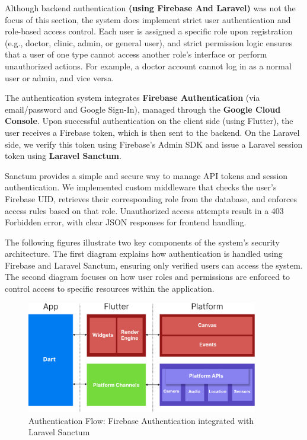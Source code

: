 \documentclass[12pt]{report}
\begin{document}
\vspace{0.5cm}

Although backend authentication \textbf{(using Firebase And Laravel)} was not the focus of this section, the system does implement strict user authentication and role-based access control. Each user is assigned a specific role upon registration (e.g., doctor, clinic, admin, or general user), and strict permission logic ensures that a user of one type cannot access another role’s interface or perform unauthorized actions. For example, a doctor account cannot log in as a normal user or admin, and vice versa.

\vspace{0.5cm}

The authentication system integrates \textbf{Firebase Authentication} (via email/password and Google Sign-In), managed through the \textbf{Google Cloud Console}. Upon successful authentication on the client side (using Flutter), the user receives a Firebase token, which is then sent to the backend. On the Laravel side, we verify this token using Firebase’s Admin SDK and issue a Laravel session token using \textbf{Laravel Sanctum}.

\vspace{0.5cm}

Sanctum provides a simple and secure way to manage API tokens and session authentication. We implemented custom middleware that checks the user’s Firebase UID, retrieves their corresponding role from the database, and enforces access rules based on that role. Unauthorized access attempts result in a 403 Forbidden error, with clear JSON responses for frontend handling.

\vspace{0.5cm}

The following figures illustrate two key components of the system's security architecture. The first diagram explains how authentication is handled using Firebase and Laravel Sanctum, ensuring only verified users can access the system. The second diagram focuses on how user roles and permissions are enforced to control access to specific resources within the application.

\vspace{0.5cm}

\begin{figure}[H]
    \centering
    \includegraphics[width=0.9\textwidth]{images/FlutterDiagram@2x.pdf}
    \caption{Authentication Flow: Firebase Authentication integrated with Laravel Sanctum}
\end{figure}
\end{document}
